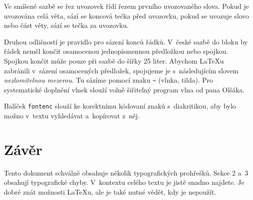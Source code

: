 \documentclass[a4paper, 10pt, twocolumn]{article}
\begin{document}
  Ve smíšené sazbě se řez uvozovek řídí řezem prvního uvozovaného slova.
  Pokud je uvozována celá věta, sází se koncová tečka před uvozovku, pokud se uvozuje slovo nebo část věty, sází se tečka za uvozovku.

  Druhou odlišností je pravidlo pro sázení konců řádků.
  V~české sazbě do bloku by řádek neměl končit osamocenou jednopísmennou předložkou nebo spojkou.
  Spojkou  končit může pouze při sazbě do šířky 25 liter.
  Abychom {\LaTeX}u zabránili v~sázení osamocených předložek, spojujeme je s~následujícím slovem \emph{nezlomitelnou mezerou}.
  Tu sázíme pomocí znaku \verb|~| (vlnka, tilda).
  Pro systematické do\-plnění vlnek slouží volně šiřitelný program vlna od pana Olšáka\footnotemark{}.

  Balíček \texttt{fontenc} slouží ke korektnímu kódovaní znaků s~diakritikou, aby bylo možno v~textu vyhledávat a~kopí\-rovat z~něj.

  \section{Závěr}

  Tento dokument schválně obsahuje několik typografických prohřešků.
  Sekce 2 a~3 obsahují typografické chyby.
  V~kontextu celého textu je jistě snadno najdete.
  Je dobré znát možnosti {\LaTeX}u, ale je také nutné vědět, kdy je nepoužít.
\end{document}
